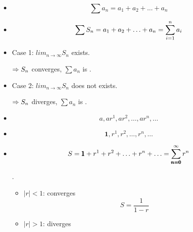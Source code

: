 \clearpage

\begin{multicols}{2}

      \begin{itemize}
        \item {}
          \begin{equation*}
            \sum a_{n} = a_{1} + a_{2} + \ldots + a_{n}
          \end{equation*}
        \item {}
          \begin{equation*}
            \sum S_{n} = a_{1} + a_{2} + \ldots + a_{n} = \sum \limits_{i = 1}^{n} a_{i}
          \end{equation*}
      \end{itemize}

      \begin{itemize}
        \item Case 1: $lim_{n \to \infty} S_{n}$ exists.
          \par $\Rightarrow S_{n}$ converges, $\sum a_{n}$ is .
        \item Case 2: $lim_{n \to \infty} S_{n}$ does not exists.
          \par $\Rightarrow S_{n}$ diverges, $\sum a_{n}$ is .
      \end{itemize}

      \begin{itemize}
        \item {}
          \begin{equation*}
            a, ar^{1}, ar^{2}, \ldots, ar^{n}, \ldots
          \end{equation*}
        \item {}
          \begin{equation*}
            \pmb{1}, r^{1}, r^{2}, \ldots, r^{n}, \ldots
          \end{equation*}        
        \item {}
          \begin{equation}
            S = \pmb{1} + r^{1} + r^{2} + \ldots + r^{n} + \ldots
              = \sum \limits_{\pmb{n = 0}}^{\infty} r^{n}
          \end{equation}
          \par {}.
          \begin{itemize}          
            \item $|r| < 1$: converges
              \begin{equation}
                S = \frac{1}{1 - r}
              \end{equation}
            \item $|r| > 1$: diverges
          \end{itemize}
      \end{itemize}


\end{multicols}
